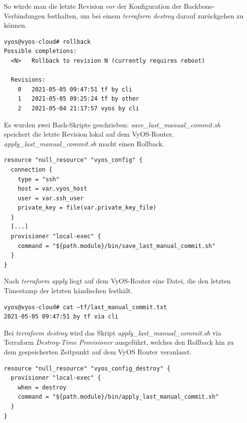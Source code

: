 So würde man die letzte Revision \textit{vor} der Konfiguration der Backbone-Verbindungen festhalten, um bei einem \textit{terraform destroy} darauf zurückgehen zu können.

\begin{lstlisting}[label=rollback-cmd-vyos,caption=Rollback auf Revision N nach Reboot]
vyos@vyos-cloud# rollback
Possible completions:
  <N>   Rollback to revision N (currently requires reboot)

  Revisions:
    0   2021-05-05 09:47:51 tf by cli
    1   2021-05-05 09:25:24 tf by other
    2   2021-05-04 21:17:57 vyos by cli
\end{lstlisting}

Es wurden zwei Bash-Skripte geschrieben: \textit{save\_last\_manual\_commit.sh} speichert die letzte Revision lokal auf dem VyOS-Router, \textit{apply\_last\_manual\_commit.sh} macht einen Rollback.

\begin{lstlisting}[label=save-last-commit-vyos,caption=Bla]
resource "null_resource" "vyos_config" {
  connection {
    type = "ssh"
    host = var.vyos_host
    user = var.ssh_user
    private_key = file(var.private_key_file)
  }
  [...]
  provisioner "local-exec" {
    command = "${path.module}/bin/save_last_manual_commit.sh"
  }
}
\end{lstlisting}

Nach \textit{terraform apply} liegt auf dem VyOS-Router eine Datei, die den letzten Timestamp der letzten \glqq händischen\grqq{} festhält.

\begin{lstlisting}[label=save-last-commit-file-vyos,caption=Blub]
vyos@vyos-cloud# cat ~tf/last_manual_commit.txt
2021-05-05 09:47:51 by tf via cli
\end{lstlisting}

Bei \textit{terraform destroy} wird das Skript \textit{apply\_last\_manual\_commit.sh} via Terraform \textit{Destroy-Time Provisioner} ausgeführt, welches den Rollback hin zu dem gespeicherten Zeitpunkt auf dem VyOS Router veranlasst.

\begin{lstlisting}[label=apply-last-commit-vyos,caption=Blub]
resource "null_resource" "vyos_config_destroy" {
  provisioner "local-exec" {
    when = destroy
    command = "${path.module}/bin/apply_last_manual_commit.sh"
  }
}
\end{lstlisting}

